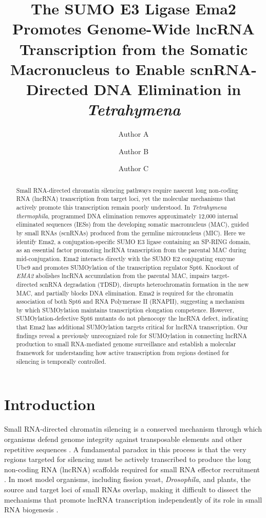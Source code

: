 \documentclass[11pt,a4paper]{article}
\title{The SUMO E3 Ligase Ema2 Promotes Genome-Wide lncRNA Transcription from the Somatic Macronucleus to Enable scnRNA-Directed DNA Elimination in \textit{Tetrahymena}}
\author[1]{Author A}
\author[1]{Author B}
\author[1,2]{Author C}
\affil[1]{Department of Molecular Biology, University of Rochester, Rochester, NY, USA}
\affil[2]{Corresponding author: \texttt{author.c@rochester.edu}}
\date{}
\begin{document}
\maketitle

\begin{abstract}
Small RNA-directed chromatin silencing pathways require nascent long non-coding RNA (lncRNA) transcription from target loci, yet the molecular mechanisms that actively promote this transcription remain poorly understood. In \textit{Tetrahymena thermophila}, programmed DNA elimination removes approximately 12,000 internal eliminated sequences (IESs) from the developing somatic macronucleus (MAC), guided by small RNAs (scnRNAs) produced from the germline micronucleus (MIC). Here we identify Ema2, a conjugation-specific SUMO E3 ligase containing an SP-RING domain, as an essential factor promoting lncRNA transcription from the parental MAC during mid-conjugation. Ema2 interacts directly with the SUMO E2 conjugating enzyme Ubc9 and promotes SUMOylation of the transcription regulator Spt6. Knockout of \textit{EMA2} abolishes lncRNA accumulation from the parental MAC, impairs target-directed scnRNA degradation (TDSD), disrupts heterochromatin formation in the new MAC, and partially blocks DNA elimination. Ema2 is required for the chromatin association of both Spt6 and RNA Polymerase II (RNAPII), suggesting a mechanism by which SUMOylation maintains transcription elongation competence. However, SUMOylation-defective Spt6 mutants do not phenocopy the lncRNA defect, indicating that Ema2 has additional SUMOylation targets critical for lncRNA transcription. Our findings reveal a previously unrecognized role for SUMOylation in connecting lncRNA production to small RNA-mediated genome surveillance and establish a molecular framework for understanding how active transcription from regions destined for silencing is temporally controlled.
\end{abstract}

\section{Introduction}

Small RNA-directed chromatin silencing is a conserved mechanism through which organisms defend genome integrity against transposable elements and other repetitive sequences \citep{Malone2009, Aravin2007, Castel2013}. A fundamental paradox in this process is that the very regions targeted for silencing must be actively transcribed to produce the long non-coding RNA (lncRNA) scaffolds required for small RNA effector recruitment \citep{Grewal2007, Moazed2009}. In most model organisms, including fission yeast, \textit{Drosophila}, and plants, the source and target loci of small RNAs overlap, making it difficult to dissect the mechanisms that promote lncRNA transcription independently of its role in small RNA biogenesis \citep{Volpe2002, Brennecke2007, Matzke2015}.
\end{document}
